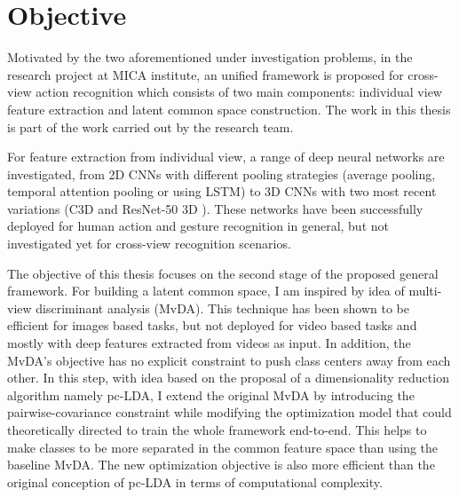     \section{Objective} \label{sec:intro_objective}
        Motivated by the two aforementioned under investigation problems, in the research project at MICA institute, an unified framework is proposed for cross-view action recognition which consists of two main components: individual view feature extraction and latent common space construction. The work in this thesis is part of the work carried out by the research team.

        For feature extraction from individual view, a range of deep neural networks are investigated, from 2D CNNs with different pooling strategies (average pooling, temporal attention pooling or using LSTM) to 3D CNNs with two most recent variations (C3D \cite{tran2015learning} and ResNet-50 3D \cite{hara2018can}).
        These networks have been successfully deployed for human action and gesture recognition in general, but not investigated yet for cross-view recognition scenarios.

        The objective of this thesis focuses on the second stage of the proposed general framework.
        For building a latent common space, I am inspired by idea of multi-view discriminant analysis (MvDA).
        This technique has been shown to be efficient for images based tasks, but not deployed for video based tasks and mostly with deep features extracted from videos as input.
        In addition, the MvDA's objective has no explicit constraint to push class centers away from each other.
        In this step, with idea based on the proposal of a dimensionality reduction algorithm namely pc-LDA, I extend the original MvDA by introducing the pairwise-covariance constraint while modifying the optimization model that could theoretically directed to train the whole framework end-to-end.
        This helps to make classes to be more separated in the common feature space than using the baseline MvDA.
        The new optimization objective is also more efficient than the original conception of pc-LDA in terms of computational complexity.

